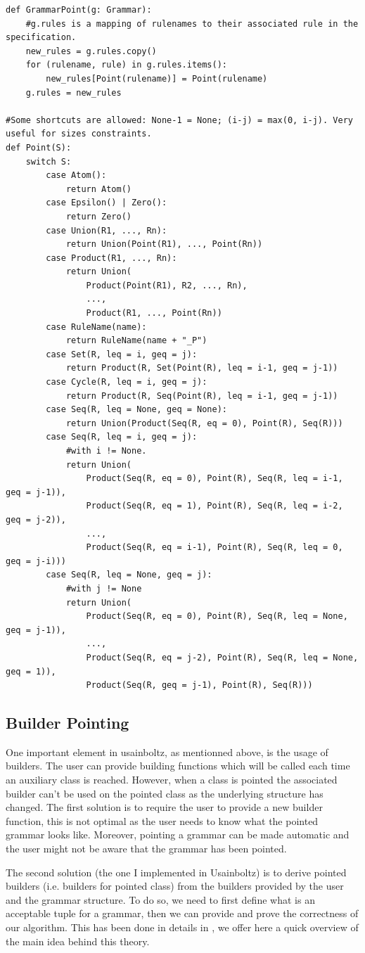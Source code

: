 \documentclass{article}
\begin{document}
\begin{lstlisting}
def GrammarPoint(g: Grammar):
    #g.rules is a mapping of rulenames to their associated rule in the specification.
    new_rules = g.rules.copy()
    for (rulename, rule) in g.rules.items():
        new_rules[Point(rulename)] = Point(rulename)
    g.rules = new_rules

#Some shortcuts are allowed: None-1 = None; (i-j) = max(0, i-j). Very useful for sizes constraints.
def Point(S):
	switch S:
		case Atom():
			return Atom()
		case Epsilon() | Zero():
			return Zero()
		case Union(R1, ..., Rn):
			return Union(Point(R1), ..., Point(Rn))
		case Product(R1, ..., Rn):
			return Union(	
				Product(Point(R1), R2, ..., Rn),
				...,
				Product(R1, ..., Point(Rn))
		case RuleName(name):
			return RuleName(name + "_P")
		case Set(R, leq = i, geq = j):
			return Product(R, Set(Point(R), leq = i-1, geq = j-1))
		case Cycle(R, leq = i, geq = j):
			return Product(R, Seq(Point(R), leq = i-1, geq = j-1))
		case Seq(R, leq = None, geq = None):
			return Union(Product(Seq(R, eq = 0), Point(R), Seq(R)))
		case Seq(R, leq = i, geq = j):
			#with i != None.
			return Union(
				Product(Seq(R, eq = 0), Point(R), Seq(R, leq = i-1, geq = j-1)),
				Product(Seq(R, eq = 1), Point(R), Seq(R, leq = i-2, geq = j-2)),
				...,
				Product(Seq(R, eq = i-1), Point(R), Seq(R, leq = 0, geq = j-i)))
		case Seq(R, leq = None, geq = j):
			#with j != None
			return Union(
				Product(Seq(R, eq = 0), Point(R), Seq(R, leq = None, geq = j-1)),
				...,
				Product(Seq(R, eq = j-2), Point(R), Seq(R, leq = None, geq = 1)),
				Product(Seq(R, geq = j-1), Point(R), Seq(R)))
\end{lstlisting}
\subsection{Builder Pointing}
One important element in usainboltz, as mentionned above, is the usage of builders. The user can provide building functions which will be called each time an auxiliary class is reached. However, when a class is pointed the associated builder can't be used on the pointed class as the underlying structure has changed. The first solution is to require the user to provide a new builder function, this is not optimal as the user needs to know what the pointed grammar looks like. Moreover, pointing a grammar can be made automatic and the user might not be aware that the grammar has been pointed.

The second solution (the one I implemented in Usainboltz) is to derive pointed builders (i.e. builders for pointed class) from the builders provided by the user and the grammar structure. To do so, we need to first define what is an acceptable tuple for a grammar, then we can provide and prove the correctness of our algorithm. This has been done in details in \cite{LAPIN}, we offer here a quick overview of the main idea behind this theory.
\end{document}
